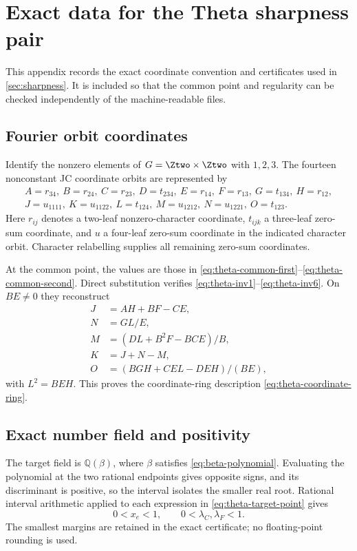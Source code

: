\section{Exact data for the Theta sharpness pair}\label{app:theta-data}

This appendix records the exact coordinate convention and certificates used in \cref{sec:sharpness}.  It is included so that the common point and regularity can be checked independently of the machine-readable files.

\subsection{Fourier orbit coordinates}

Identify the nonzero elements of $G=\Ztwo\times\Ztwo$ with $1,2,3$.  The fourteen nonconstant JC coordinate orbits are represented by
\begin{gather*}
A=r_{34},\ B=r_{24},\ C=r_{23},\ D=t_{234},\ E=r_{14},\ F=r_{13},\
G=t_{134},\ H=r_{12},\\
J=u_{1111},\ K=u_{1122},\ L=t_{124},\ M=u_{1212},\
N=u_{1221},\ O=t_{123}.
\end{gather*}
Here $r_{ij}$ denotes a two-leaf nonzero-character coordinate, $t_{ijk}$ a three-leaf zero-sum coordinate, and $u$ a four-leaf zero-sum coordinate in the indicated character orbit.  Character relabelling supplies all remaining zero-sum coordinates.

At the common point, the values are those in \eqref{eq:theta-common-first}--\eqref{eq:theta-common-second}.  Direct substitution verifies \eqref{eq:theta-inv1}--\eqref{eq:theta-inv6}.  On $BE\ne0$ they reconstruct
\begin{align*}
J&=AH+BF-CE,\\
N&=GL/E,\\
M&=(DL+B^2F-BCE)/B,\\
K&=J+N-M,\\
O&=(BGH+CEL-DEH)/(BE),
\end{align*}
with $L^2=BEH$.  This proves the coordinate-ring description \eqref{eq:theta-coordinate-ring}.

\subsection{Exact number field and positivity}

The target field is $\mathbb Q(\beta)$, where $\beta$ satisfies \eqref{eq:beta-polynomial}.  Evaluating the polynomial at the two rational endpoints gives opposite signs, and its discriminant is positive, so the interval isolates the smaller real root.  Rational interval arithmetic applied to each expression in \eqref{eq:theta-target-point} gives
\[
0<x_e<1,
\qquad
0<\lambda_C,\lambda_F<1.
\]
The smallest margins are retained in the exact certificate; no floating-point rounding is used.

